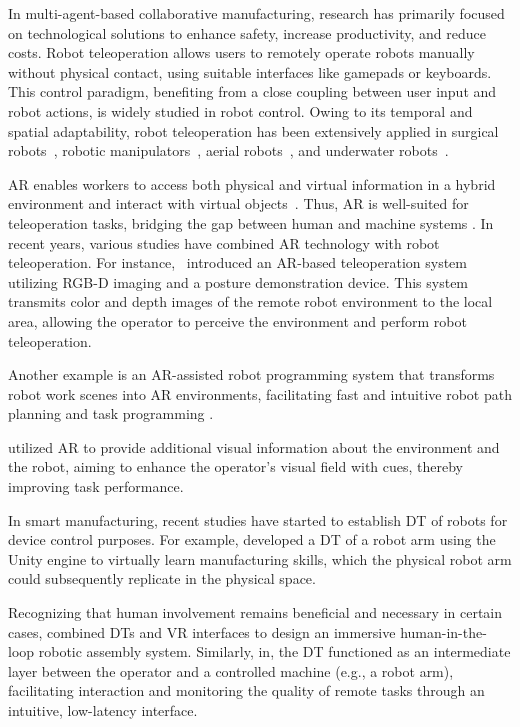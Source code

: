     In multi-agent-based collaborative manufacturing, research has primarily focused on technological solutions to enhance safety, increase productivity, and reduce costs. Robot teleoperation allows users to remotely operate robots manually without physical contact, using suitable interfaces like gamepads or keyboards. This control paradigm, benefiting from a close coupling between user input and robot actions, is widely studied in robot control. Owing to its temporal and spatial adaptability, robot teleoperation has been extensively applied in surgical robots~\cite{22}, robotic manipulators~\cite{11}, aerial robots~\cite{23}, and underwater robots~\cite{24}.
    
    \ac{AR} enables workers to access both physical and virtual information in a hybrid environment and interact with virtual objects~\cite{26,27}. Thus, \ac{AR} is well-suited for teleoperation tasks, bridging the gap between human and machine systems \cite{this-article}. In recent years, various studies have combined \ac{AR} technology with robot teleoperation. For instance,~\cite{10} introduced an \ac{AR}-based teleoperation system utilizing RGB-D imaging and a posture demonstration device. This system transmits color and depth images of the remote robot environment to the local area, allowing the operator to perceive the environment and perform robot teleoperation.
    
    Another example is an \ac{AR}-assisted robot programming system that transforms robot work scenes into \ac{AR} environments, facilitating fast and intuitive robot path planning and task programming \cite{30}.

    \cite{32} utilized \ac{AR} to provide additional visual information about the environment and the robot, aiming to enhance the operator's visual field with cues, thereby improving task performance.

    In smart manufacturing, recent studies have started to establish \ac{DT} of robots for device control purposes. For example, \cite{37} developed a \ac{DT} of a robot arm using the Unity engine to virtually learn manufacturing skills, which the physical robot arm could subsequently replicate in the physical space.

    Recognizing that human involvement remains beneficial and necessary in certain cases,\cite{41} combined \acp{DT} and \ac{VR} interfaces to design an immersive human-in-the-loop robotic assembly system. Similarly, in\cite{42}, the \ac{DT} functioned as an intermediate layer between the operator and a controlled machine (e.g., a robot arm), facilitating interaction and monitoring the quality of remote tasks through an intuitive, low-latency interface.

